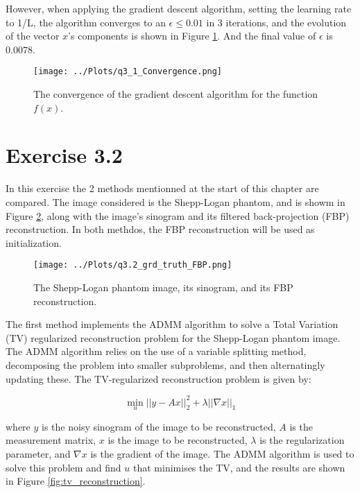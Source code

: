 \documentclass[12pt]{report} %
\begin{document}
However, when applying the gradient descent algorithm, setting the learning rate to 1/L, the algorithm converges to an $\epsilon \leq 0.01$ in 3 iterations, and the evolution of the vector $x$'s components is shown in Figure \ref{fig:gradient_descent}. And the final value of $\epsilon$ is 0.0078.

\begin{figure}[htbp]
    \centering
    \texttt{[image: ../Plots/q3\_1\_Convergence.png]}
    \caption{The convergence of the gradient descent algorithm for the function $f(x)$.}
    \label{fig:gradient_descent}
\end{figure}



\section{Exercise 3.2}

In this exercise the 2 methods mentionned at the start of this chapter are compared. The image considered is the Shepp-Logan phantom, and is showm in Figure \ref{fig:fbp_reconstruction}, along with the image's sinogram and its filtered back-projection (FBP) reconstruction. In both methdos, the FBP reconstruction will be used as initialization.

\begin{figure}[htbp]
    \centering
    \texttt{[image: ../Plots/q3.2\_grd\_truth\_FBP.png]}
    \caption{The Shepp-Logan phantom image, its sinogram, and its FBP reconstruction.}
    \label{fig:fbp_reconstruction}
\end{figure}

The first method implements the ADMM algorithm to solve a Total Variation (TV) regularized reconstruction problem for the Shepp-Logan phantom image. The ADMM algorithm relies on the use of a variable splitting method, decomposing the problem into smaller subproblems, and then alternatingly updating these\cite{boyd2011distributed}. The TV-regularized reconstruction problem is given by:

\begin{equation}
    \min_{u} ||y - Ax||^2_2 + \lambda ||\nabla x||_1
\end{equation}

where $y$ is the noisy sinogram of the image to be reconstructed, $A$ is the measurement matrix, $x$ is the image to be reconstructed, $\lambda$ is the regularization parameter, and $\nabla x$ is the gradient of the image. The ADMM algorithm is used to solve this problem and find $u$ that minimises the TV, and the results are shown in Figure \ref{fig:tv_reconstruction}.
\end{document}
